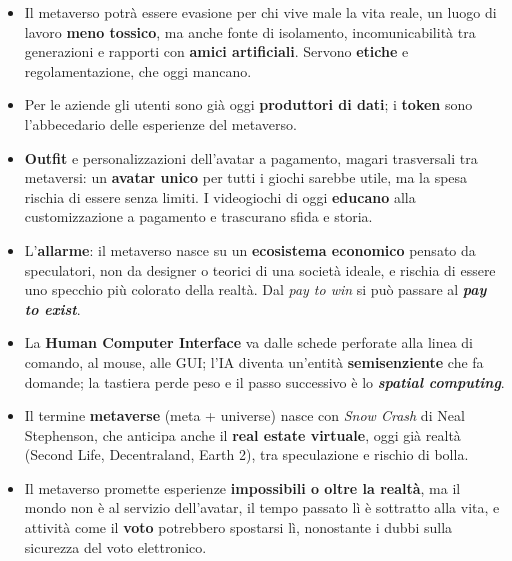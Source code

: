 \begin{itemize}
        \textbf{sociale}, ambiente persistente e programmabile, \textbf{Matrix}
        con tutti i sensi (servono i \textbf{guanti} aptici), \textbf{realtà
        aumentata} (frenata da privacy, digital divide e batteria), mondo
        parallelo che replica servizi esistenti (strada sbagliata), io digitale,
        \textbf{rete di mondi 3D}, \emph{Ready Player One}.
  \item Il metaverso potrà essere evasione per chi vive male la vita reale, un
        luogo di lavoro \textbf{meno tossico}, ma anche fonte di isolamento,
        incomunicabilità tra generazioni e rapporti con \textbf{amici
        artificiali}. Servono \textbf{etiche} e regolamentazione, che oggi
        mancano.
  \item Per le aziende gli utenti sono già oggi \textbf{produttori di dati}; i
        \textbf{token} sono l'abbecedario delle esperienze del metaverso.
  \item \textbf{Outfit} e personalizzazioni dell'avatar a pagamento, magari
        trasversali tra metaversi: un \textbf{avatar unico} per tutti i giochi
        sarebbe utile, ma la spesa rischia di essere senza limiti. I videogiochi
        di oggi \textbf{educano} alla customizzazione a pagamento e trascurano
        sfida e storia.
  \item L'\textbf{allarme}: il metaverso nasce su un \textbf{ecosistema
        economico} pensato da speculatori, non da designer o teorici di una
        società ideale, e rischia di essere uno specchio più colorato della
        realtà. Dal \emph{pay to win} si può passare al \textbf{\emph{pay to
        exist}}.
  \item La \textbf{Human Computer Interface} va dalle schede perforate alla
        linea di comando, al mouse, alle GUI; l'IA diventa un'entità
        \textbf{semisenziente} che fa domande; la tastiera perde peso e il passo
        successivo è lo \textbf{\emph{spatial computing}}.
  \item Il termine \textbf{metaverse} (meta + universe) nasce con \emph{Snow
        Crash} di Neal Stephenson, che anticipa anche il \textbf{real estate
        virtuale}, oggi già realtà (Second Life, Decentraland, Earth 2), tra
        speculazione e rischio di bolla.
  \item Il metaverso promette esperienze \textbf{impossibili o oltre la realtà},
        ma il mondo non è al servizio dell'avatar, il tempo passato lì è
        sottratto alla vita, e attività come il \textbf{voto} potrebbero
        spostarsi lì, nonostante i dubbi sulla sicurezza del voto elettronico.

\end{itemize}
